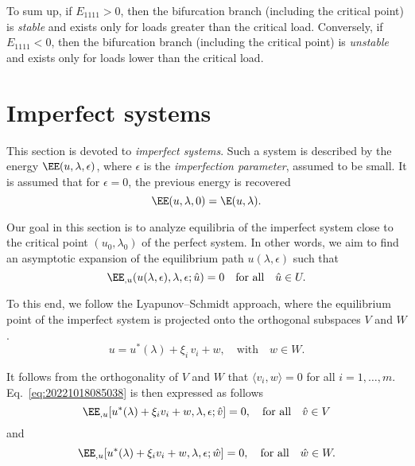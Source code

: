 To sum up, if $E_{1111} > 0$, then the bifurcation branch (including the critical point) is \emph{stable} and exists
only for loads greater than the critical load. Conversely, if $E_{1111} < 0$, then the bifurcation branch (including the
critical point) is \emph{unstable} and exists only for loads lower than the critical load.

\section{Imperfect systems}
\label{sec:20221018083712}

This section is devoted to \emph{imperfect systems}. Such a system is described by the energy
\(\EE(u, \lambda, \epsilon)\), where \(\epsilon\) is the \emph{imperfection parameter}, assumed to be small. It is
assumed that for \(\epsilon = 0\), the previous energy is recovered
\begin{equation}
  \EE(u, \lambda, 0) = \E(u, \lambda).
\end{equation}

Our goal in this section is to analyze equilibria of the imperfect system close to the critical point
\((u_0, \lambda_0)\) of the perfect system. In other words, we aim to find an asymptotic expansion of the equilibrium
path \(u(\lambda, \epsilon)\) such that
\begin{equation}
  \label{eq:20221018085038}
  \EE_{,u}(u(\lambda, \epsilon), \lambda, \epsilon; \hat{u}) = 0 \quad \text{for all} \quad \hat{u} \in U.
\end{equation}

To this end, we follow the Lyapunov--Schmidt approach, where the equilibrium point of the imperfect system is projected
onto the orthogonal subspaces \(V\) and \(W\).
\begin{equation}
  \label{eq:20220902174235}
  u = u^\ast(\lambda) + \xi_i \, v_i + w, \quad \text{with} \quad w \in W.
\end{equation}

It follows from the orthogonality of $V$ and $W$ that $\langle v_i, w \rangle = 0$ for all $i=1, \ldots,
m$. Eq.~\eqref{eq:20221018085038} is then expressed as follows
\begin{equation}
  \label{eq:20220901120544}
  \EE_{,u}[u^\ast(\lambda) + \xi_i v_i + w, \lambda, \epsilon; \hat{v}] = 0, \quad \text{for all} \quad \hat{v} \in V
\end{equation}
and
\begin{equation}
  \label{eq:20220825143616}
  \EE_{,u}[u^\ast(\lambda) + \xi_i v_i + w, \lambda, \epsilon; \hat{w}] = 0, \quad \text{for all} \quad \hat{w} \in W.
\end{equation}

